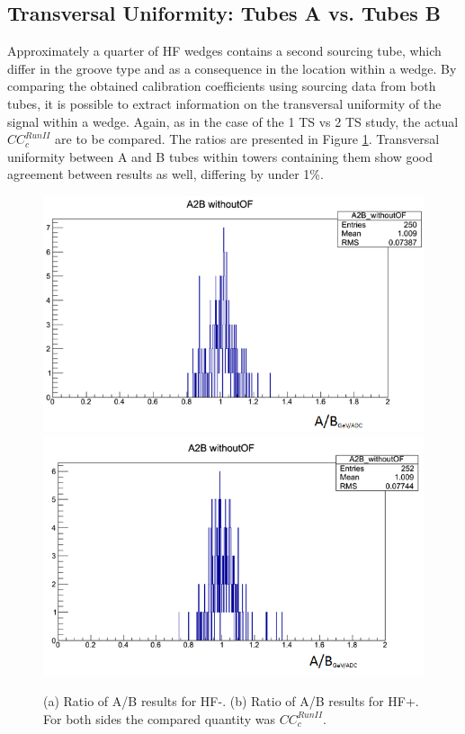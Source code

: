 \subsection{Transversal Uniformity: Tubes A vs. Tubes B}
Approximately a quarter of HF wedges contains a second sourcing tube, which
differ in the groove type and as a consequence in the location within a wedge.
By comparing the obtained calibration coefficients using sourcing data from both
tubes, it is possible to extract information on the transversal uniformity of the signal within a wedge. Again, as in the case of the 1 TS vs 2 TS study, the actual ${CC}^{Run II}_{c}$ are to be compared. The ratios are presented in Figure \ref{fig:HF_A2B}. Transversal uniformity between A and B tubes within towers containing them show good agreement between results as well, differing by under 1\%.
\begin{figure}[htb]
    \centering
    \includegraphics[width=.45\textwidth]{figures/ch_hfcalibration/HFM_A2B_woOF.png}
    \includegraphics[width=.45\textwidth]{figures/ch_hfcalibration/HFP_A2B_woOF.png}
    \caption{(a) Ratio of A/B results for HF-. (b) Ratio of A/B results for HF+. For both sides the compared quantity was ${CC}^{Run II}_{c}$.}
    \label{fig:HF_A2B}
\end{figure}


